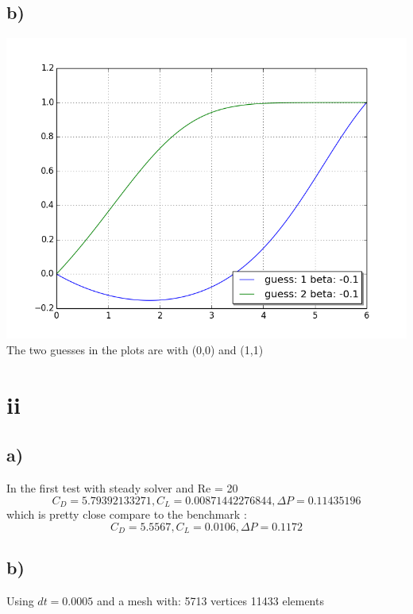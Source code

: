 \documentclass[a4paper,norsk]{article}
\begin{document}
\subsection*{b)}
\includegraphics[trim = 0mm 0mm 0mm 0mm, clip, scale=0.3]{guess.png} 
The two guesses in the plots are with (0,0) and (1,1)

\section*{ii}
\subsection*{a)}
In the first test with steady solver and Re = 20
$$C_D= 5.79392133271, C_L = 0.00871442276844, \Delta P = 0.11435196$$
which is pretty close compare to the benchmark :$$C_D =  5.5567 , C_L = 0.0106 , \Delta P =  0.1172 $$
\subsection*{b)}
Using $dt = 0.0005 $ and a mesh with:  5713 vertices 11433 elements
\end{document}
